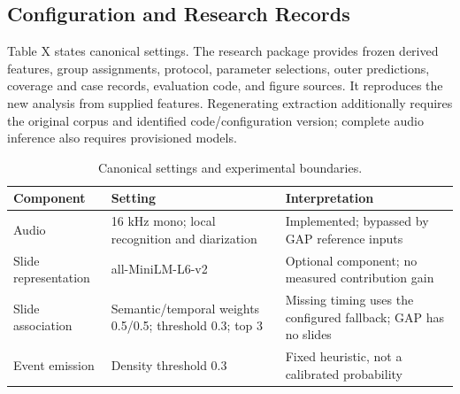 \documentclass[journal]{IEEEtran}
\begin{document}
\subsection{Configuration and Research Records}
Table X states canonical settings. The research package provides frozen derived features, group assignments, protocol, parameter selections, outer predictions, coverage and case records, evaluation code, and figure sources. It reproduces the new analysis from supplied features. Regenerating extraction additionally requires the original corpus and identified code/configuration version; complete audio inference also requires provisioned models.

\begin{table}[t]
\caption{Canonical settings and experimental boundaries.}
\label{tab:10}
\centering\footnotesize
\setlength{\tabcolsep}{3pt}
\renewcommand{\arraystretch}{1.13}
\begin{tabular}{p{}p{}p{}}
\toprule
{\raggedright Component\par} & {\raggedright Setting\par} & {\raggedright Interpretation\par} \\
\midrule
{\raggedright Audio\par} & {\raggedright 16 kHz mono; local recognition and diarization\par} & {\raggedright Implemented; bypassed by GAP reference inputs\par} \\
{\raggedright Slide representation\par} & {\raggedright all-MiniLM-L6-v2\par} & {\raggedright Optional component; no measured contribution gain\par} \\
{\raggedright Slide association\par} & {\raggedright Semantic/temporal weights 0.5/0.5; threshold 0.3; top 3\par} & {\raggedright Missing timing uses the configured fallback; GAP has no slides\par} \\
{\raggedright Event emission\par} & {\raggedright Density threshold 0.3\par} & {\raggedright Fixed heuristic, not a calibrated probability\par} \\

\end{tabular}
\end{table}
\end{document}
